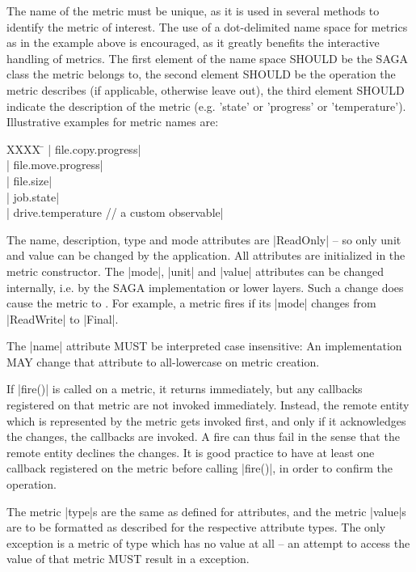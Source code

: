     The name of the metric must be unique, as it is used in
    several methods to identify the metric of interest.  The use
    of a dot-delimited name space for metrics as in the example
    above is encouraged, as it greatly benefits the interactive
    handling of metrics.  The first element of the name space
    SHOULD be the SAGA class the metric belongs to, the second
    element SHOULD be the operation the metric describes (if
    applicable, otherwise leave out), the third element SHOULD
    indicate the description of the metric (e.g.  'state' or
    'progress' or 'temperature').  Illustrative examples for
    metric names are:
 
    \up
    \begin{tabbing}
     XXXX \= \kill
          \> | file.copy.progress|\\
          \> | file.move.progress|\\
          \> | file.size|\\
          \> | job.state|\\
          \> | drive.temperature  // a custom observable|\\
    \end{tabbing}
    \up\up
 
    The name, description, type and mode attributes are
    |ReadOnly| -- so only unit and value can be changed by the
    application.  All attributes are initialized in the metric
    constructor.  The |mode|, |unit| and |value| attributes can
    be changed internally, i.e. by the SAGA implementation or
    lower layers.  Such a change does cause the metric to
    .  For example, a metric fires if its |mode| changes
    from |ReadWrite| to |Final|.
 
    The |name| attribute MUST be interpreted case insensitive:
    An implementation MAY change that attribute to
    all-lowercase on metric creation.
 
    If |fire()| is called on a metric, it returns immediately,
    but any callbacks registered on that metric are not invoked
    immediately.  Instead, the remote entity which is
    represented by the metric gets invoked first, and only if it
    acknowledges the changes, the callbacks are invoked.  A fire
    can thus fail in the sense that the remote entity declines
    the changes.  It is good practice to have at least one
    callback registered on the metric before calling |fire()|,
    in order to confirm the operation.
 
    The metric |type|s are the same as defined for attributes,
    and the metric |value|s are to be formatted as described for
    the respective attribute types. The only exception
    is a metric of type  which has no value at all --
    an attempt to access the value of that metric MUST result in
    a  exception.
 
